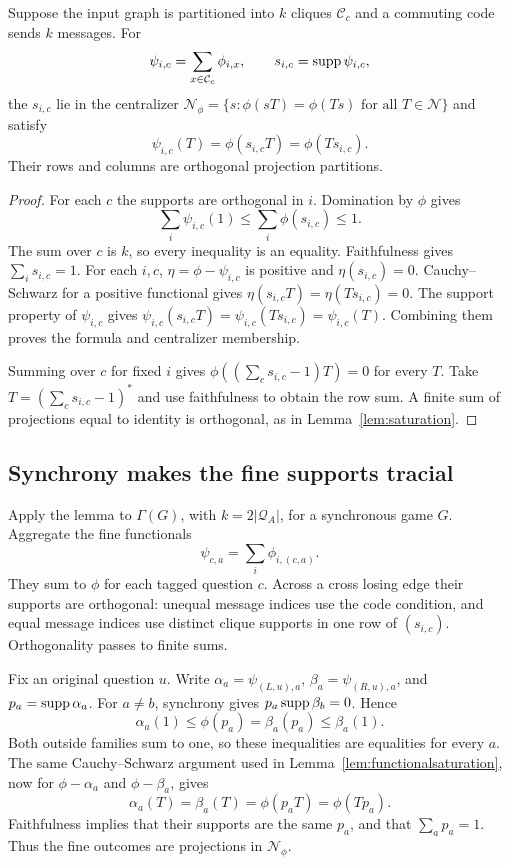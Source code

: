 \begin{lemma}\label{lem:functionalsaturation}
Suppose the input graph is partitioned into $k$ cliques $\mathcal C_c$ and a commuting code sends $k$ messages. For
\[
 \psi_{i,c}=\sum_{x\in \mathcal C_c}\phi_{i,x},\qquad s_{i,c}=\operatorname{supp}\psi_{i,c},
\]
the $s_{i,c}$ lie in the centralizer
$\mathcal N_\phi=\{s:\phi(sT)=\phi(Ts)\text{ for all }T\in\mathcal N\}$ and satisfy
\[
 \psi_{i,c}(T)=\phi(s_{i,c}T)=\phi(Ts_{i,c}).
\]
Their rows and columns are orthogonal projection partitions.
\end{lemma}
\begin{proof}
For each $c$ the supports are orthogonal in $i$. Domination by $\phi$ gives
\[
 \sum_i\psi_{i,c}(1)\leq\sum_i\phi(s_{i,c})\leq1.
\]
The sum over $c$ is $k$, so every inequality is an equality. Faithfulness gives $\sum_i s_{i,c}=1$. For each $i,c$, $\eta=\phi-\psi_{i,c}$ is positive and $\eta(s_{i,c})=0$. Cauchy--Schwarz for a positive functional gives $\eta(s_{i,c}T)=\eta(Ts_{i,c})=0$. The support property of $\psi_{i,c}$ gives $\psi_{i,c}(s_{i,c}T)=\psi_{i,c}(Ts_{i,c})=\psi_{i,c}(T)$. Combining them proves the formula and centralizer membership.

Summing over $c$ for fixed $i$ gives $\phi((\sum_c s_{i,c}-1)T)=0$ for every $T$. Take $T=(\sum_c s_{i,c}-1)^*$ and use faithfulness to obtain the row sum. A finite sum of projections equal to identity is orthogonal, as in Lemma~\ref{lem:saturation}.
\end{proof}

\subsection{Synchrony makes the fine supports tracial}
Apply the lemma to $\Gamma(G)$, with $k=2|\mathcal Q_A|$, for a synchronous game $G$. Aggregate the fine functionals
\[
 \psi_{c,a}=\sum_i\phi_{i,(c,a)}.
\]
They sum to $\phi$ for each tagged question $c$. Across a cross losing edge their supports are orthogonal: unequal message indices use the code condition, and equal message indices use distinct clique supports in one row of $(s_{i,c})$. Orthogonality passes to finite sums.

Fix an original question $u$. Write $\alpha_a=\psi_{(L,u),a}$, $\beta_a=\psi_{(R,u),a}$, and $p_a=\operatorname{supp}\alpha_a$. For $a\ne b$, synchrony gives $p_a\operatorname{supp}\beta_b=0$. Hence
\[
 \alpha_a(1)\leq\phi(p_a)=\beta_a(p_a)\leq\beta_a(1).
\]
Both outside families sum to one, so these inequalities are equalities for every $a$. The same Cauchy--Schwarz argument used in Lemma~\ref{lem:functionalsaturation}, now for $\phi-\alpha_a$ and $\phi-\beta_a$, gives
\[
 \alpha_a(T)=\beta_a(T)=\phi(p_aT)=\phi(Tp_a).
\]
Faithfulness implies that their supports are the same $p_a$, and that $\sum_a p_a=1$. Thus the fine outcomes are projections in $\mathcal N_\phi$.

